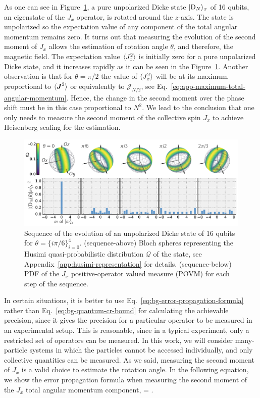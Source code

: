 As one can see in Figure~\ref{fig:vd-secuence-evo}, a pure unpolarized Dicke state $\vert{\ensuremath{\textnormal{D}_{N}}}\rangle_x$ of 16 qubits, an eigenstate of the $J_x$ operator, is rotated around the $z$-axis.
The state is unpolarized so the expectation value of any component of the total angular momentum remains zero.
It turns out that measuring the evolution of the second moment of $J_x$ allows the estimation of rotation angle $\theta$, and therefore, the magnetic field.
The expectation value $\langle{J_x^2}\rangle$ is initially zero for a pure unpolarized Dicke state, and it increases rapidly as it can be seen in the Figure~\ref{fig:vd-secuence-evo}.
Another observation is that for $\theta=\pi/2$ the value of $\langle{J_x^2}\rangle$ will be at its maximum proportional to $\langle{\ensuremath{\boldsymbol{J}}^2}\rangle$ or equivalently to $\mathcal{J}_{N/2}$, see Eq.~\eqref{eq:app-maximum-total-angular-momentum}.
Hence, the change in the second moment over the phase shift must be in this case proportional to $N^2$.
We lead to the conclusion that one only needs to measure the second moment of the collective spin $J_x$ to achieve Heisenberg scaling for the estimation.
\begin{figure}[htp]
  \centering
  \includegraphics[scale=.65]{img/VD_evolution_of_dicke.pdf}
  \caption[Sequence of Dicke state evolution]{
  Sequence of the evolution of an unpolarized Dicke state of 16 qubits for $\theta=\{i\pi/6\}_{i=0}^4$.
  (sequence-above) Bloch spheres representing the Husimi quasi-probabilistic distribution $\mathcal{Q}$ of the state, see Appendix~\ref{app:husimi-representation} for details.
  (sequence-below) PDF of the $J_x$ positive-operator valued measure (POVM) for each step of the sequence.}
  \label{fig:vd-secuence-evo}
\end{figure}

In certain situations, it is better to use Eq.~\eqref{eq:bg-error-propagation-formula} rather than Eq.~\eqref{eq:bg-quantum-cr-bound} for calculating the achievable precision, since it gives the precision for a particular operator to be measured in an experimental setup.
This is reasonable, since in a typical experiment, only a restricted set of operators can be measured.
In this work, we will consider many-particle systems in which the particles cannot be accessed individually, and only collective quantities can be measured.
As we said, measuring the second moment of $J_x$ is a valid choice to estimate the rotation angle.
In the following equation, we show the error propagation formula when measuring the second moment of the $J_x$ total angular momentum component,
\be
  \varinv{\theta} = .
  \label{eq:vd-error-propagation}
\ee

